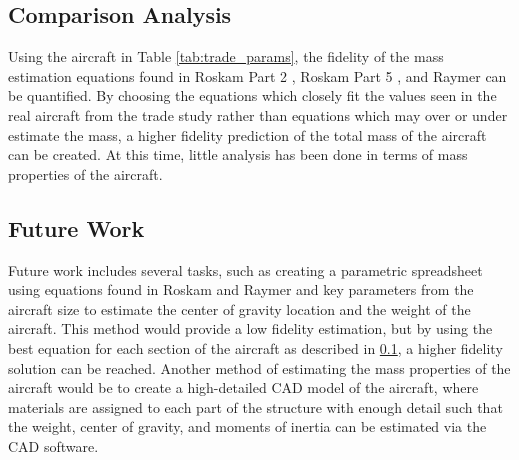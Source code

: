 \subsection{Comparison Analysis}
\label{subsection: comparison}
Using the aircraft in Table \ref{tab:trade_params}, the fidelity of the mass estimation equations found in Roskam Part 2 \cite{roskam_2}, Roskam Part 5 \cite{roskam_5}, and Raymer \cite{raymer} can be quantified. By choosing the equations which closely fit the values seen in the real aircraft from the trade study rather than equations which may over or under estimate the mass, a higher fidelity prediction of the total mass of the aircraft can be created. At this time, little analysis has been done in terms of mass properties of the aircraft.

\subsection{Future Work}
Future work includes several tasks, such as creating a parametric spreadsheet using equations found in Roskam and Raymer and key parameters from the aircraft size to estimate the center of gravity location and the weight of the aircraft. This method would provide a low fidelity estimation, but by using the best equation for each section of the aircraft as described in \ref{subsection: comparison}, a higher fidelity solution can be reached. Another method of estimating the mass properties of the aircraft would be to create a high-detailed CAD model of the aircraft, where materials are assigned to each part of the structure with enough detail such that the weight, center of gravity, and moments of inertia can be estimated via the CAD software. 






